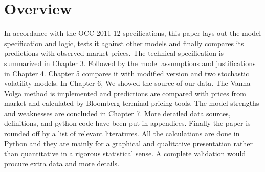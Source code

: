 \chapter{Overview}
In accordance with the OCC 2011-12 specifications, this paper lays out the model specification and logic, tests it against other models and finally compares its predictions with observed market prices. 
\newline
\newline
The technical specification is summarized in Chapter 3. Followed by the model assumptions and justifications in Chapter 4. Chapter 5 compares it with modified version and two stochastic volatility models. In Chapter 6, We showed the source of our data. The Vanna-Volga method is implemented and predictions are compared with prices from market and calculated by Bloomberg terminal pricing tools.
The model strengths and weaknesses are concluded in Chapter 7. More detailed data sources, definitions, and python code have been put in appendices. Finally the paper is rounded off by a list of relevant literatures. \newline
\newline
All the calculations are done in Python and they are mainly for a graphical and qualitative presentation rather than quantitative in a rigorous statistical sense. A complete validation would procure extra data and more details.
